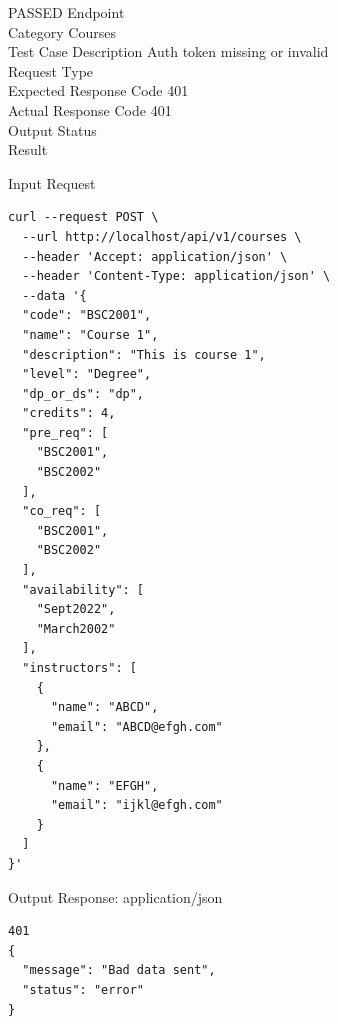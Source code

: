 \begin{testcase}{79}{PASSED}
Endpoint \hfill {}\\
Category \hfill Courses\\
Test Case Description \hfill Auth token missing or invalid\\

Request Type    \hfill {}\\
Expected Response Code    \hfill 401\\
Actual Response Code    \hfill 401\\

Output Status \hfill {}\\
Result \hfill {}

\begin{ipblock}{Input Request}
\begin{verbatim}
curl --request POST \
  --url http://localhost/api/v1/courses \
  --header 'Accept: application/json' \
  --header 'Content-Type: application/json' \
  --data '{
  "code": "BSC2001",
  "name": "Course 1",
  "description": "This is course 1",
  "level": "Degree",
  "dp_or_ds": "dp",
  "credits": 4,
  "pre_req": [
    "BSC2001",
    "BSC2002"
  ],
  "co_req": [
    "BSC2001",
    "BSC2002"
  ],
  "availability": [
    "Sept2022",
    "March2002"
  ],
  "instructors": [
    {
      "name": "ABCD",
      "email": "ABCD@efgh.com"
    },
    {
      "name": "EFGH",
      "email": "ijkl@efgh.com"
    }
  ]
}'
\end{verbatim}
\end{ipblock}

\begin{opblock}{Output Response: application/json}
\begin{verbatim}
401
{
  "message": "Bad data sent",
  "status": "error"
}
\end{verbatim}
\end{opblock}
\end{testcase}

